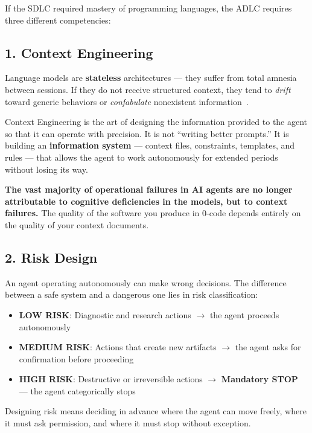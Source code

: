 If the SDLC required mastery of programming languages, the ADLC requires three different competencies:

\subsection*{1. Context Engineering}

Language models are \textbf{stateless} architectures --- they suffer from total amnesia between sessions. If they do not receive structured context, they tend to \textit{drift} toward generic behaviors or \textit{confabulate} nonexistent information~\cite{anthropic:context-engineering}.

Context Engineering is the art of designing the information provided to the agent so that it can operate with precision. It is not ``writing better prompts.'' It is building an \textbf{information system} --- context files, constraints, templates, and rules --- that allows the agent to work autonomously for extended periods without losing its way.

\textbf{The vast majority of operational failures in AI agents are no longer attributable to cognitive deficiencies in the models, but to context failures.} The quality of the software you produce in 0-code depends entirely on the quality of your context documents.

\subsection*{2. Risk Design}

An agent operating autonomously can make wrong decisions. The difference between a safe system and a dangerous one lies in risk classification:

\begin{itemize}
  \item \textbf{LOW RISK}: Diagnostic and research actions $\rightarrow$ the agent proceeds autonomously
  \item \textbf{MEDIUM RISK}: Actions that create new artifacts $\rightarrow$ the agent asks for confirmation before proceeding
  \item \textbf{HIGH RISK}: Destructive or irreversible actions $\rightarrow$ \textbf{Mandatory STOP} --- the agent categorically stops
\end{itemize}

Designing risk means deciding in advance where the agent can move freely, where it must ask permission, and where it must stop without exception.

